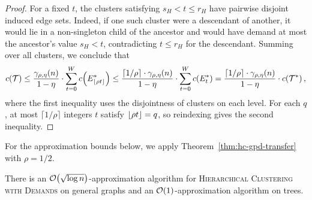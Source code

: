 \begin{proof}
    For a fixed $t$, the clusters satisfying $s_H<t\leq r_H$ have pairwise disjoint induced edge sets. Indeed, if one such cluster were a descendant of another, it would lie in a non-singleton child of the ancestor and would have demand at most the ancestor's value $s_H<t$, contradicting $t\leq r_H$ for the descendant. Summing over all clusters, we conclude that
    \begin{align*}
        c\mathopen{}\left( \mathcal{T} \right)
        \leq\frac{\gamma_{\rho,\eta}(n)}{1-\eta}\cdot
            \sum_{t=0}^{W}c\mathopen{}\left( E_{\mathopen{}\left\lfloor \rho t \right\rfloor}^* \right)
            \leq\frac{\lceil1/\rho\rceil\cdot \gamma_{\rho,\eta}(n)}{1-\eta}\cdot
            \sum_{t=0}^{W}c\mathopen{}\left( E_{t}^* \right)
        =\frac{\lceil1/\rho\rceil\cdot\gamma_{\rho,\eta}(n)}{1-\eta}\cdot
            c\mathopen{}\left( \mathcal{T}^* \right),
    \end{align*}
    where the first inequality uses the disjointness of clusters on each level. For each $q$, at most $\lceil1/\rho\rceil$ integers $t$ satisfy $\mathopen{}\left\lfloor \rho t \right\rfloor=q$, so reindexing gives the second inequality.
\end{proof}

For the approximation bounds below, we apply Theorem~\ref{thm:hc-gpd-transfer} with $\rho=1/2$.

\begin{corollary}\label{cor:hc-general-bounds}
    There is an $\mathcal{O}\mathopen{}\left( \sqrt{\log n} \right)$-approximation algorithm for \textsc{Hierarchical Clustering with Demands} on general graphs and an $\mathcal{O}\mathopen{}\left( 1 \right)$-approximation algorithm on trees.
\end{corollary}
